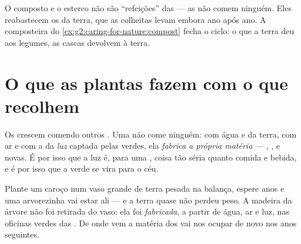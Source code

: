 \begin{remark}\label{rem:g4:what-plants-need:soil}
O composto e o esterco não são ``refeições'' das  --- as
 não comem ninguém. Eles reabastecem os  da
terra, que as colheitas levam embora ano após ano. A composteira do
\cref{ex:g2:caring-for-nature:compost} fecha o ciclo: o que a terra
deu aos legumes, as cascas devolvem à terra.
\end{remark}

\section{O que as plantas fazem com o que recolhem}

\begin{proposition}\label{prop:g4:what-plants-need:make}
Os  crescem comendo outros . Uma  não come
ninguém: com água e  da terra, com ar e com a 
da \emph{luz} captada pelas  verdes, ela \emph{fabrica a
própria matéria} --- , ,  e  novas. É por
isso que a luz é, para uma , coisa tão séria quanto comida e
bebida, e é por isso que a  verde se vira para o céu.
\end{proposition}
\admitted

\begin{example}\label{ex:g4:what-plants-need:tree}
Plante um caroço num vaso grande de terra pesada na balança, espere
anos e uma arvorezinha vai estar ali --- e a terra quase não perdeu
peso. A madeira da árvore não foi retirada do vaso: ela foi
\emph{fabricada}, a partir de água, ar e luz, nas oficinas verdes
das . De onde vem a matéria dos  vai nos ocupar de
novo nos anos seguintes.
\end{example}

